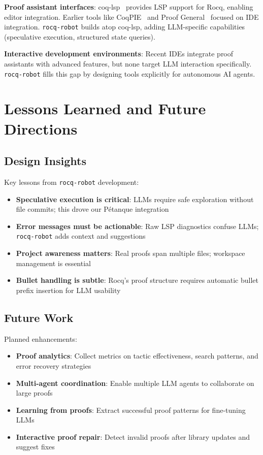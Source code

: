 \documentclass[11pt,a4paper]{article}
\newcommand{\tool}{\texttt{rocq-robot}\xspace}
\begin{document}
\textbf{Proof assistant interfaces}: coq-lsp~\cite{gallego2022coqlsp} provides LSP support for Rocq, enabling editor integration. Earlier tools like CoqPIE~\cite{roe2016coqpie} and Proof General~\cite{aspinall2000proof} focused on IDE integration. \tool builds atop coq-lsp, adding LLM-specific capabilities (speculative execution, structured state queries).

\textbf{Interactive development environments}: Recent IDEs integrate proof assistants with advanced features, but none target LLM interaction specifically. \tool fills this gap by designing tools explicitly for autonomous AI agents.

\section{Lessons Learned and Future Directions}

\subsection{Design Insights}

Key lessons from \tool development:

\begin{itemize}
\item \textbf{Speculative execution is critical}: LLMs require safe exploration without file commits; this drove our P\'etanque integration
\item \textbf{Error messages must be actionable}: Raw LSP diagnostics confuse LLMs; \tool adds context and suggestions
\item \textbf{Project awareness matters}: Real proofs span multiple files; workspace management is essential
\item \textbf{Bullet handling is subtle}: Rocq's proof structure requires automatic bullet prefix insertion for LLM usability
\end{itemize}

\subsection{Future Work}

Planned enhancements:

\begin{itemize}
\item \textbf{Proof analytics}: Collect metrics on tactic effectiveness, search patterns, and error recovery strategies
\item \textbf{Multi-agent coordination}: Enable multiple LLM agents to collaborate on large proofs
\item \textbf{Learning from proofs}: Extract successful proof patterns for fine-tuning LLMs
\item \textbf{Interactive proof repair}: Detect invalid proofs after library updates and suggest fixes
\end{itemize}
\end{document}

